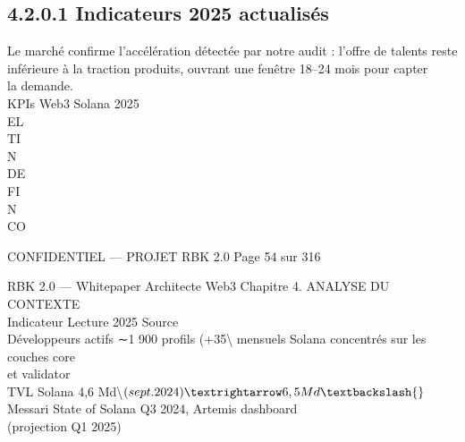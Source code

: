 \subsection{4.2.0.1 Indicateurs 2025 actualisés}
Le marché confirme l’accélération détectée par notre audit : l’offre de talents reste inférieure à la traction produits, ouvrant une fenêtre 18–24 mois pour capter\\
la demande.\\
\vspace{0.5em}
KPIs Web3 Solana 2025\\
\vspace{0.5em}
\vspace{0.5em}
\vspace{0.5em}
\vspace{0.5em}
EL\\
TI\\
N\\
DE\\
FI\\
N\\
CO\\
\vspace{0.5em}
\vspace{0.5em}
\vspace{0.5em}
\vspace{0.5em}
\begin{confidential}CONFIDENTIEL — PROJET RBK 2.0                                             Page 54 sur 316\end{confidential}
RBK 2.0 — Whitepaper Architecte Web3                                                                                  Chapitre 4. ANALYSE DU CONTEXTE\\
\vspace{0.5em}
\vspace{0.5em}
\vspace{0.5em}
Indicateur                    Lecture 2025                      Source\\
Développeurs actifs           ∼1 900 profils (+35\textbackslash{}%
mensuels Solana               concentrés sur les couches core\\
et validator\\
TVL Solana                    4,6 Md\textbackslash{}$ (sept. 2024) → 6,5 Md\textbackslash{}$ Messari State of Solana Q3 2024, Artemis dashboard\\
(projection Q1 2025)\\
